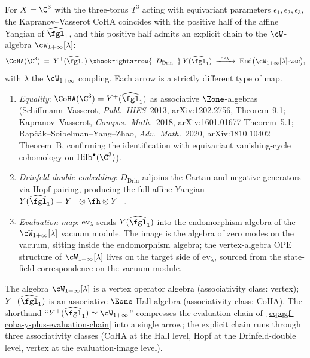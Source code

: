 \begin{proposition}[\texorpdfstring{$\CoHA(\C^3) = Y^+(\widehat{\fgl}_1)$}{CoHA(C-3) = Y-+(widehatfgl-1)} and the evaluation chain to \texorpdfstring{$\cW_{1+\infty}$}{W-1+inf}]
\label{prop:qgf-coha-y-plus-winfty-chain}
For $X=\C^3$ with the three-torus $T^3$ acting with equivariant parameters $\epsilon_1,\epsilon_2,\epsilon_3$, the Kapranov--Vasserot CoHA coincides with the positive half of the affine Yangian of $\widehat{\fgl}_1$, and this positive half admits an explicit chain to the $\cW$-algebra $\cW_{1+\infty}[\lambda]$:
\begin{equation}
\CoHA(\C^3)\;=\;Y^+(\widehat{\fgl}_1)\;\xhookrightarrow{\;\;D_{\mathrm{Drin}}\;\;}\;Y(\widehat{\fgl}_1)\;\xrightarrow{\;\;\mathrm{ev}_\lambda\;\;}\;\mathrm{End}\bigl(\cW_{1+\infty}[\lambda]\text{-}\mathrm{vac}\bigr),
\label{eq:qgf-coha-y-plus-evaluation-chain}
\end{equation}
with $\lambda$ the $\cW_{1+\infty}$ coupling. Each arrow is a strictly different type of map.
\begin{enumerate}[label=\textup{(\alph*)}]
 \item \emph{Equality}: $\CoHA(\C^3)=Y^+(\widehat{\fgl}_1)$ as associative $\Eone$-algebras (Schiffmann--Vasserot, \emph{Publ.\ IHES}\ 2013, arXiv:1202.2756, Theorem~9.1; Kapranov--Vasserot, \emph{Compos.\ Math.}\ 2018, arXiv:1601.01677 Theorem~5.1; Rap\v{c}\'ak--Soibelman--Yang--Zhao, \emph{Adv.\ Math.}\ 2020, arXiv:1810.10402 Theorem~B, confirming the identification with equivariant vanishing-cycle cohomology on $\mathrm{Hilb}^\bullet(\C^3)$).
 \item \emph{Drinfeld-double embedding}: $D_{\mathrm{Drin}}$ adjoins the Cartan and negative generators via Hopf pairing, producing the full affine Yangian $Y(\widehat{\fgl}_1)=Y^-\otimes\fh\otimes Y^+$.
 \item \emph{Evaluation map}: $\mathrm{ev}_\lambda$ sends $Y(\widehat{\fgl}_1)$ into the endomorphism algebra of the $\cW_{1+\infty}[\lambda]$ vacuum module. The image is the algebra of zero modes on the vacuum, sitting inside the endomorphism algebra; the vertex-algebra OPE structure of $\cW_{1+\infty}[\lambda]$ lives on the target side of $\mathrm{ev}_\lambda$, sourced from the state-field correspondence on the vacuum module.
\end{enumerate}
The algebra $\cW_{1+\infty}[\lambda]$ is a vertex operator algebra (associativity class: vertex); $Y^+(\widehat{\fgl}_1)$ is an associative $\Eone$-Hall algebra (associativity class: CoHA). The shorthand ``$Y^+(\widehat{\fgl}_1)\simeq\cW_{1+\infty}$'' compresses the evaluation chain of~\eqref{eq:qgf-coha-y-plus-evaluation-chain} into a single arrow; the explicit chain runs through three associativity classes (CoHA at the Hall level, Hopf at the Drinfeld-double level, vertex at the evaluation-image level).
\end{proposition}

